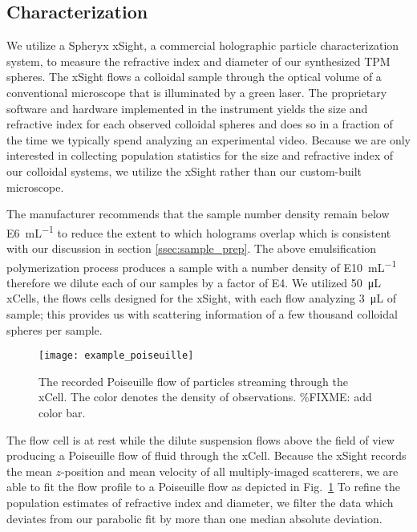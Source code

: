 \subsection{Characterization}


We utilize a Spheryx xSight, a commercial holographic particle characterization system,
to measure the  refractive index and diameter of our synthesized TPM spheres.
The xSight flows a colloidal sample through the optical volume of a conventional microscope
that is illuminated by a green laser. The proprietary software and hardware implemented in
the instrument yields the size and refractive index for each observed colloidal spheres and
does so in a fraction of the time we typically spend analyzing an experimental video.
Because we are only interested in collecting population statistics for the size and refractive
index of our colloidal systems, we utilize the xSight rather than our custom-built microscope.

The manufacturer recommends that the sample number density remain below 
\SI{E6}{\milli\liter^{-1}} to reduce the extent to which
holograms overlap which is consistent with our discussion in section \ref{ssec:sample_prep}.
The above emulsification polymerization process produces
a sample with a number density of \SI{E10}{\milli\liter^{-1}} therefore we
dilute each of our samples by a factor of \si{E4}.
We utilized \SI{50}{\micro \liter} xCells, the flows cells designed for the xSight,
with each flow analyzing \SI{3}{\micro\liter} of sample; this provides us with
scattering information of a few thousand colloidal spheres per sample.


\begin{figure}
    \centering
    \texttt{[image: example\_poiseuille]}
    \caption{The recorded Poiseuille flow of particles streaming through the xCell. The
      color denotes the density of observations. \%FIXME: add color bar.}
    \label{fig:flow_prof}
\end{figure}


The flow cell is at rest while the dilute suspension flows above
the field of view producing a Poiseuille flow of fluid through the
xCell. Because the xSight records the mean $z$-position and mean 
velocity of all multiply-imaged scatterers, we are able to fit the flow
profile to a Poiseuille flow as depicted in Fig.~\ref{fig:flow_prof}
To refine the population estimates of refractive index and diameter, 
we filter the data which deviates from our parabolic fit by more 
than one median absolute deviation.

